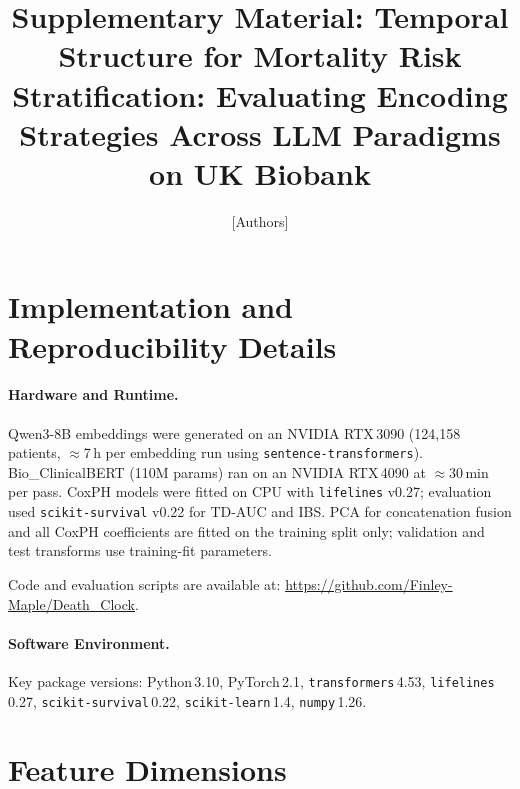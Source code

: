 \documentclass[runningheads]{llncs}
\begin{document}
\title{Supplementary Material: Temporal Structure for Mortality Risk
       Stratification: Evaluating Encoding Strategies Across LLM Paradigms
       on UK Biobank}
\authorrunning{[Authors]}
\author{[Authors]}
\institute{[Institution]}
\maketitle

\setcounter{section}{0}

\section{Implementation and Reproducibility Details}
\label{supp:impl}

\paragraph{Hardware and Runtime.}
Qwen3-8B embeddings were generated on an NVIDIA RTX\,3090 (124{,}158 patients,
$\approx$7\,h per embedding run using \texttt{sentence-transformers}).
Bio\_ClinicalBERT (110M params) ran on an NVIDIA RTX\,4090 at $\approx$30\,min
per pass.
CoxPH models were fitted on CPU with \texttt{lifelines} v0.27; evaluation
used \texttt{scikit-survival} v0.22 for TD-AUC and IBS.
PCA for concatenation fusion and all CoxPH coefficients are fitted on the
training split only; validation and test transforms use training-fit
parameters.
\begin{sloppypar}
Code and evaluation scripts are available at:
{\small\url{https://github.com/Finley-Maple/Death\_Clock}}.
\end{sloppypar}

\paragraph{Software Environment.}
Key package versions: Python\,3.10, PyTorch\,2.1, \texttt{transformers}\,4.53,
\texttt{lifelines}\,0.27, \texttt{scikit-survival}\,0.22,
\texttt{scikit-learn}\,1.4, \texttt{numpy}\,1.26.

\section{Feature Dimensions}
\label{supp:dims}
\end{document}
